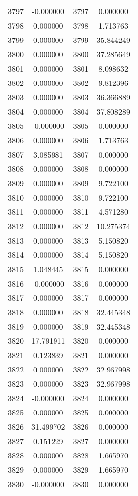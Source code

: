 \documentclass[12pt]{article}
\begin{document}
\begin{longtable}{@{}cccc@{}}
3797 & -0.000000 & 3797 & 0.000000 \\
3798 & 0.000000 & 3798 & 1.713763 \\
3799 & 0.000000 & 3799 & 35.844249 \\
3800 & 0.000000 & 3800 & 37.285649 \\
3801 & 0.000000 & 3801 & 8.098632 \\
3802 & 0.000000 & 3802 & 9.812396 \\
3803 & 0.000000 & 3803 & 36.366889 \\
3804 & 0.000000 & 3804 & 37.808289 \\
3805 & -0.000000 & 3805 & 0.000000 \\
3806 & 0.000000 & 3806 & 1.713763 \\
3807 & 3.085981 & 3807 & 0.000000 \\
3808 & 0.000000 & 3808 & 0.000000 \\
3809 & 0.000000 & 3809 & 9.722100 \\
3810 & 0.000000 & 3810 & 9.722100 \\
3811 & 0.000000 & 3811 & 4.571280 \\
3812 & 0.000000 & 3812 & 10.275374 \\
3813 & 0.000000 & 3813 & 5.150820 \\
3814 & 0.000000 & 3814 & 5.150820 \\
3815 & 1.048445 & 3815 & 0.000000 \\
3816 & -0.000000 & 3816 & 0.000000 \\
3817 & 0.000000 & 3817 & 0.000000 \\
3818 & 0.000000 & 3818 & 32.445348 \\
3819 & 0.000000 & 3819 & 32.445348 \\
3820 & 17.791911 & 3820 & 0.000000 \\
3821 & 0.123839 & 3821 & 0.000000 \\
3822 & 0.000000 & 3822 & 32.967998 \\
3823 & 0.000000 & 3823 & 32.967998 \\
3824 & -0.000000 & 3824 & 0.000000 \\
3825 & 0.000000 & 3825 & 0.000000 \\
3826 & 31.499702 & 3826 & 0.000000 \\
3827 & 0.151229 & 3827 & 0.000000 \\
3828 & 0.000000 & 3828 & 1.665970 \\
3829 & 0.000000 & 3829 & 1.665970 \\
3830 & -0.000000 & 3830 & 0.000000 \\

\end{longtable}
\end{document}
